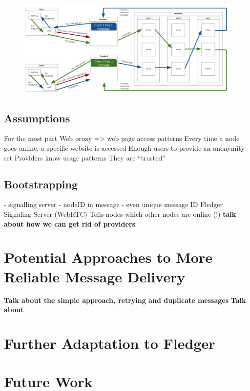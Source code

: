 \documentclass[a4paper,11pt,oneside]{report}
\begin{document}
\begin{figure}[H]
    \centering
    \includegraphics[width=1\linewidth]{plots/implementation.png}
    \caption{}
    \label{fig:implementation}
\end{figure}

\subsection{Assumptions}

For the most part
Web proxy => web page access patterns
Every time a node goes online, a specific website is accessed
Enough users to provide an anonymity set
Providers know usage patterns
They are “trusted”

\subsection{Bootstrapping}
- signalling server
- nodeID in message
- even unique message ID
Fledger Signaling Server (WebRTC)
Tells nodes which other nodes are online (!)
\textbf{talk about how we can get rid of providers}


\section{Potential Approaches to More Reliable Message Delivery}
\label{sec:reliable_message_delivery}
\textbf{Talk about the simple approach, retrying and duplicate messages}
\textbf{Talk about }

\section{Further Adaptation to Fledger}

\section{Future Work}
\end{document}
